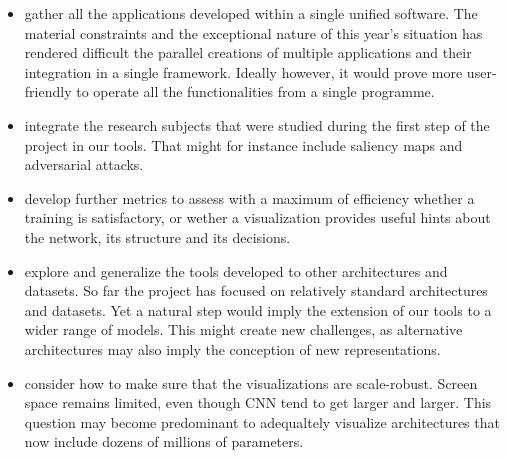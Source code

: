  \begin{itemize}
	\item gather all the applications developed within a single unified software. The material constraints and the exceptional nature of this year's situation has rendered difficult the parallel creations of multiple applications and their integration in a single framework. Ideally however, it would prove more user-friendly to operate all the functionalities from a single programme.
	\item integrate the research subjects that were studied during the first step of the project in our tools. That might for instance include saliency maps and adversarial attacks.
	\item develop further metrics to assess with a maximum of efficiency whether a training is satisfactory, or wether a visualization provides useful hints about the network, its structure and its decisions.
	\item explore and generalize the tools developed to other architectures and datasets. So far the project has focused on relatively standard architectures and datasets. Yet a natural step would imply the extension of our tools to a wider range of models. This might create new challenges, as alternative architectures may also imply the conception of new representations.
	\item consider how to make sure that the visualizations are scale-robust. Screen space remains limited, even though CNN tend to get larger and larger. This question may become predominant to adequaltely visualize architectures that now include dozens of millions of parameters.
\end{itemize}



